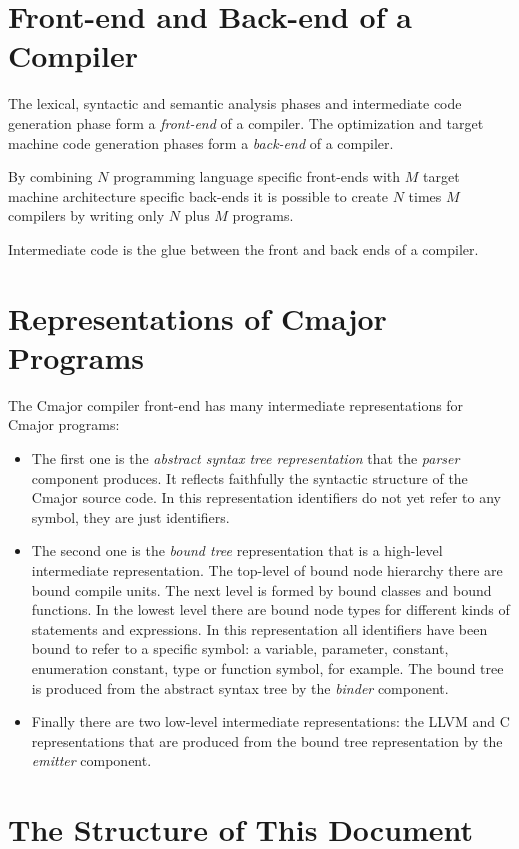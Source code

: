 \documentclass[a4paper,oneside,11pt]{book}
\theoremstyle{definition}
\begin{document}
\section{Front-end and Back-end of a Compiler}

The lexical, syntactic and semantic analysis phases and intermediate code generation phase
form a \emph{front-end} of a compiler. The optimization and target machine code generation phases
form a \emph{back-end} of a compiler.

By combining $N$ programming language specific front-ends with $M$ target machine architecture specific back-ends
it is possible to create $N$ times $M$ compilers by writing only $N$ plus $M$ programs.

Intermediate code is the glue between the front and back ends of a compiler.

\section{Representations of Cmajor Programs}

The Cmajor compiler front-end has many intermediate representations for Cmajor programs:
\begin{itemize}
\item
The first one is the \emph{abstract syntax tree representation} that the \emph{parser} component produces.
It reflects faithfully the syntactic structure of the Cmajor source code.
In  this representation identifiers do not yet refer to any symbol, they are just identifiers.
\item
The second one is the \emph{bound tree} representation that is a high-level intermediate representation.
The top-level of bound node hierarchy there are bound compile units.
The next level is formed by bound classes and bound functions. In the lowest level there are bound node types for different kinds of statements and expressions.
In this representation all identifiers have been bound to refer to a specific symbol:
a variable, parameter, constant, enumeration constant, type or function symbol, for example.
The bound tree is produced from the abstract syntax tree by the \emph{binder} component.
\item
Finally there are two low-level intermediate representations: the LLVM and C representations that are produced from the bound tree representation by
the \emph{emitter} component.
\end{itemize}

\section{The Structure of This Document}
\end{document}
